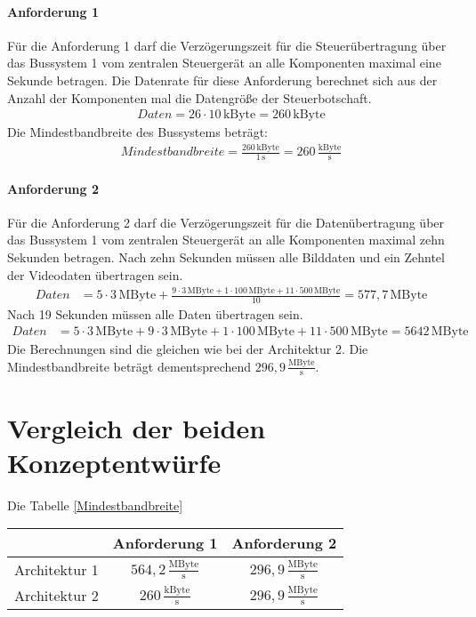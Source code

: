 \paragraph{Anforderung 1}
Für die Anforderung 1 darf die Verzögerungszeit für die Steuerübertragung über das Bussystem 1 vom zentralen Steuergerät an alle Komponenten maximal eine Sekunde betragen.
Die Datenrate für diese Anforderung berechnet sich aus der Anzahl der Komponenten mal die Datengröße der Steuerbotschaft.
\begin{align}
	Daten = 26 \cdot 10\,\mathrm{kByte} = 260\,\mathrm{kByte}
\end{align}
Die Mindestbandbreite des Bussystems beträgt:
\begin{align}
	Mindestbandbreite = \frac{260\,\mathrm{kByte}}{1\,\mathrm{s}} = 260\,\frac{\mathrm{kByte}}{\mathrm{s}}
\end{align}
\paragraph{Anforderung 2}
Für die Anforderung 2 darf die Verzögerungszeit für die Datenübertragung über das Bussystem 1 vom zentralen Steuergerät an alle Komponenten maximal zehn Sekunden betragen.
Nach zehn Sekunden müssen alle Bilddaten und ein Zehntel der Videodaten übertragen sein.
\begin{align}
	Daten &= 5 \cdot 3\,\mathrm{MByte} + \frac{9 \cdot 3 \,\mathrm{MByte} + 1 \cdot 100\,\mathrm{MByte} + 11 \cdot 500\,\mathrm{MByte}}{10} =  577,7\,\mathrm{MByte}
\end{align}
Nach 19 Sekunden müssen alle Daten übertragen sein.
\begin{align}
	Daten &= 5 \cdot 3\,\mathrm{MByte} + 9 \cdot 3 \,\mathrm{MByte} + 1 \cdot 100\,\mathrm{MByte} + 11 \cdot 500\,\mathrm{MByte} =  5642\,\mathrm{MByte}
\end{align}
Die Berechnungen sind die gleichen wie bei der Architektur 2. Die Mindestbandbreite beträgt dementsprechend $ 296,9\,\frac{\mathrm{MByte}}{\mathrm{s}} $.
\section{Vergleich der beiden Konzeptentwürfe}
Die Tabelle \ref{Mindestbandbreite}
\begin{table}[]	
	\centering
	\renewcommand{\arraystretch}{1.5}	%
	\label{tab:Mindestbandbreite}
	\begin{tabular}{c|c|c|}
		& \textbf{Anforderung 1} & \textbf{Anforderung 2} \\
		\hline
		Architektur 1 & $ 564,2\,\frac{\mathrm{MByte}}{\mathrm{s}} $ & $ 296,9\,\frac{\mathrm{MByte}}{\mathrm{s}} $ \\
		\hline
		Architektur 2 & $ 260\,\frac{\mathrm{kByte}}{\mathrm{s}} $ & $ 296,9\,\frac{\mathrm{MByte}}{\mathrm{s}} $ \\
		\hline
	\end{tabular} 
\end{table}
